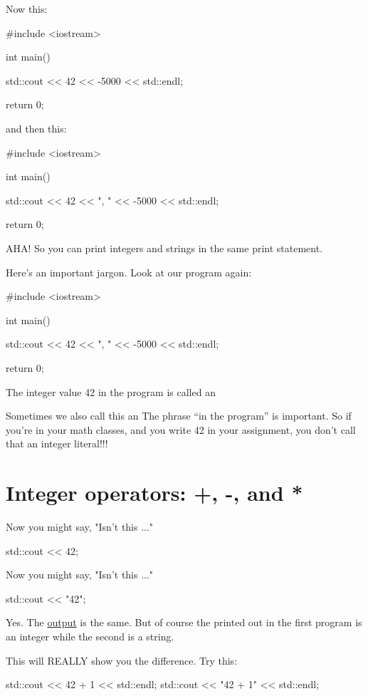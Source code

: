 Now this:
\begin{console}
#include <iostream>
  
int main()
{
    std::cout << 42 << -5000 << std::endl;
    
    return 0;
}
\end{console}

and then this:
\begin{console}
#include <iostream>
  
int main()
{
    std::cout << 42 << ", " << -5000 << std::endl;
    
    return 0;
}
\end{console}

AHA! So you can print integers and strings in the same print statement.

%

%

Here's an important jargon. Look at our program again:

\begin{console}
#include <iostream>
  
int main()
{
    std::cout << 42 << ", " << -5000 << std::endl;
    
    return 0;
}
\end{console}

The integer value 42 in the program is called an 


Sometimes we also call this an  The phrase
“in the program” is important. So if you're in your math classes, and you
write 42 in your assignment, you don't call that an integer literal!!!

\newpage\section{Integer operators: +, -, and *}

Now you might say, "Isn't this ..."
\begin{console}
std::cout << 42;
\end{console}
Now you might say, "Isn't this ..."
\begin{console}
std::cout << "42";
\end{console}

Yes. The \underline{output} is the same. But of course the 
printed out in
the first program is an integer while the second is a string.

This will REALLY show you the difference. Try this:
\begin{console}
std::cout << 42 + 1 << std::endl;
std::cout << "42 + 1" << std::endl;
\end{console}

